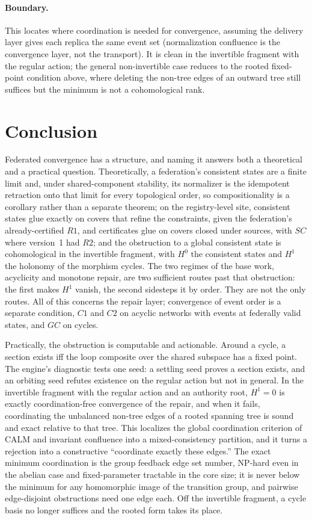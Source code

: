 \documentclass[11pt,a4paper]{article}
\theoremstyle{plain}
\theoremstyle{definition}
\theoremstyle{remark}
\newcommand{\Hz}{H^0}
\newcommand{\Ho}{H^1}
\renewcommand{\_}{\origunderscore\allowbreak}
\begin{document}
\paragraph{Boundary.} This locates where coordination is needed for convergence, assuming the
delivery layer gives each replica the same event set (normalization confluence is the convergence
layer, not the transport). It is clean in the invertible fragment with the regular action; the
general non-invertible case reduces to the rooted fixed-point condition above, where deleting the
non-tree edges of an outward tree still suffices but the minimum is not a cohomological rank.

\section{Conclusion}
\label{sec:conclusion}

Federated convergence has a structure, and naming it answers both a theoretical and a practical
question. Theoretically, a federation's consistent states are a finite limit and, under
shared-component stability, its normalizer is the idempotent retraction onto that limit for every
topological order, so compositionality is a corollary rather than a separate theorem; on the
registry-level site, consistent states glue exactly on covers that refine the constraints, given the
federation's already-certified $R1$, and certificates glue on covers closed under sources, with $SC$
where version~1 had $R2$; and the obstruction to a global consistent state is cohomological in the
invertible fragment, with $\Hz$ the consistent states and $\Ho$ the holonomy of the morphism cycles.
The two regimes of the base work, acyclicity and monotone repair, are two sufficient routes past that
obstruction: the first makes $\Ho$ vanish, the second sidesteps it by order. They are not the only
routes. All of this concerns the repair layer; convergence of event order is a separate condition,
$C1$ and $C2$ on acyclic networks with events at federally valid states, and $GC$ on cycles.

Practically, the obstruction is computable and actionable. Around a cycle, a section exists iff the
loop composite over the shared subspace has a fixed point. The engine's diagnostic tests one seed: a
settling seed proves a section exists, and an orbiting seed refutes existence on the regular action
but not in general. In the invertible fragment with the regular action and an authority root,
$\Ho = 0$ is exactly coordination-free convergence of the repair, and when it fails, coordinating the
unbalanced non-tree edges of a rooted spanning tree is sound and exact relative to that tree. This
localizes the global coordination criterion of CALM and invariant confluence into a mixed-consistency
partition, and it turns a rejection into a constructive ``coordinate exactly these edges.'' The exact
minimum coordination is the group feedback edge set number, NP-hard even in the abelian case and
fixed-parameter tractable in the core size; it is never below the minimum for any homomorphic image
of the transition group, and pairwise edge-disjoint obstructions need one edge each. Off the
invertible fragment, a cycle basis no longer suffices and the rooted form takes its place.
\end{document}
